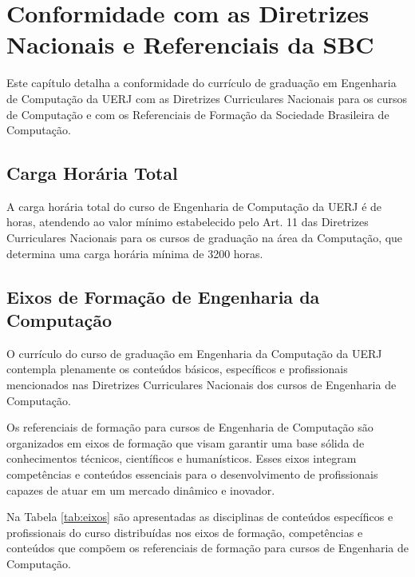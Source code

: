 \chapter{Conformidade com as Diretrizes Nacionais e Referenciais da SBC}

Este capítulo detalha a conformidade do currículo de graduação em Engenharia de Computação da UERJ com as Diretrizes Curriculares Nacionais para os cursos de Computação e com os  Referenciais de Formação da Sociedade Brasileira de Computação.


\section{Carga Horária Total}

A carga horária total do curso de Engenharia de Computação da UERJ é de \tHorasCurso horas, atendendo ao valor mínimo estabelecido pelo Art. 11 das Diretrizes Curriculares Nacionais para os cursos de graduação na área da Computação, que determina uma carga horária mínima de 3200 horas.


\section{Eixos de Formação de Engenharia da Computação}

O currículo do curso de graduação em Engenharia da Computação da UERJ contempla plenamente os conteúdos básicos, específicos e profissionais mencionados nas Diretrizes Curriculares Nacionais dos cursos de Engenharia de Computação.

Os referenciais de formação para cursos de Engenharia de Computação são organizados em eixos de formação que visam garantir uma base sólida de conhecimentos técnicos, científicos e humanísticos. Esses eixos integram competências e conteúdos essenciais para o desenvolvimento de profissionais capazes de atuar em um mercado dinâmico e inovador.

Na Tabela \ref{tab:eixos} são apresentadas as disciplinas de conteúdos específicos e profissionais do curso distribuídas nos eixos de formação, competências e conteúdos que compõem os referenciais de formação para cursos de Engenharia de Computação.




